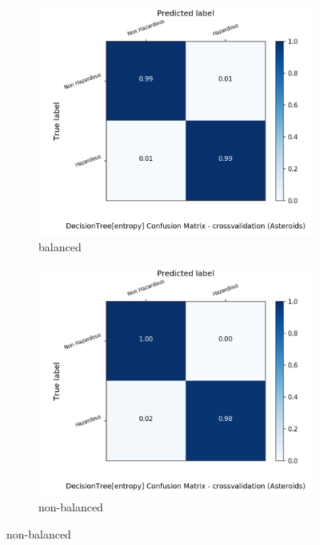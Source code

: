\begin{figure}[H]
	\centering
	\begin{subfigure}{.5\textwidth}
		\centering
		\includegraphics[width=1.1\textwidth]{Plots/asteroids/asteroids_DecisionTree_entropy_balance_True_crossvalidation.png}
		\caption{balanced}
	\end{subfigure}%
	\begin{subfigure}{.5\textwidth}
		\centering
		\includegraphics[width=1.1\textwidth]{Plots/asteroids/asteroids_DecisionTree_entropy_balance_False_crossvalidation.png}
		\caption{non-balanced}
	\end{subfigure}
\end{figure}


